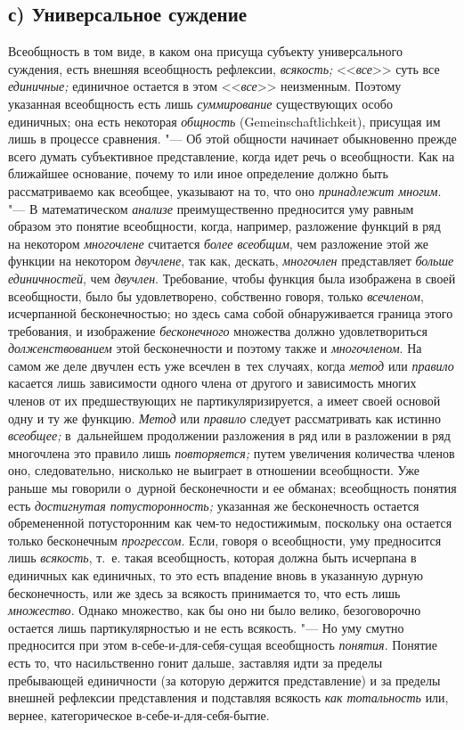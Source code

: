 \subsection[с) Универсальное суждение]{с) Универсальное суждение}
Всеобщность в том виде, в каком она присуща субъекту
универсального суждения, есть внешняя всеобщность рефлексии,
{\em всякость;} <<{\em все}>> суть все {\em единичные;}
единичное остается в этом <<{\em все}>> неизменным.
Поэтому указанная всеобщность есть лишь {\em суммирование}
существующих особо единичных; она есть некоторая
{\em общность} (Gemein\-schaft\-lich\-keit),
присущая им лишь в процессе сравнения. "--- Об
этой общности начинает обыкновенно прежде всего думать субъективное
представление, когда идет речь о всеобщности. Как на
ближайшее основание, почему то или иное определение должно быть
рассматриваемо как всеобщее, указывают на то, что оно
{\em принадлежит многим}. "--- В математическом {\em анализе}
преимущественно предносится уму равным образом это понятие
всеобщности, когда, например, разложение функций в ряд на некотором
{\em многочлене} считается {\em более всеобщим}, чем разложение этой же функции
на некотором {\em двучлене}, так как, дескать, {\em многочлен} представляет
{\em больше единичностей}, чем {\em двучлен}. Требование, чтобы функция была
изображена в своей всеобщности, было бы удовлетворено, собственно говоря,
только {\em всечленом}, исчерпанной бесконечностью; но здесь сама собой
обнаруживается граница этого требования, и изображение {\em бесконечного}
множества должно удовлетвориться {\em долженствованием} этой бесконечности и
поэтому также и {\em многочленом}. На самом же деле двучлен есть уже всечлен
в~тех случаях, когда {\em метод} или {\em правило} касается лишь зависимости
одного члена от другого и зависимость многих членов от их предшествующих не
партикуляризируется, а имеет своей основой одну и ту же функцию. {\em Метод}
или {\em правило} следует рассматривать как истинно {\em всеобщее;}
в~дальнейшем продолжении разложения в ряд или в разложении в ряд многочлена
это правило лишь {\em повторяется;} путем увеличения количества членов оно,
следовательно, нисколько не выиграет в отношении всеобщности. Уже раньше мы
говорили о~дурной бесконечности и ее обманах; всеобщность понятия есть
{\em достигнутая потусторонность;} указанная же бесконечность остается
обремененной потусторонним как чем-то недостижимым, поскольку она остается
только бесконечным {\em прогрессом}. Если, говоря о всеобщности, уму
предносится лишь {\em всякость}, т.~е. такая всеобщность, которая должна быть
исчерпана в единичных как единичных, то это есть впадение вновь в указанную
дурную бесконечность, или же здесь за всякость принимается то, что есть лишь
{\em множество}. Однако множество, как бы оно ни было велико, безоговорочно
остается лишь партикулярностью и не есть всякость. "--- Но уму смутно
предносится при этом в-себе-и-для-себя-сущая всеобщность {\em понятия}. Понятие
есть то, что насильственно гонит дальше, заставляя идти за пределы пребывающей
единичности (за которую держится представление) и за пределы внешней рефлексии
представления и подставляя всякость {\em как тотальность} или, вернее,
категорическое в-себе-и-для-себя-бытие.

